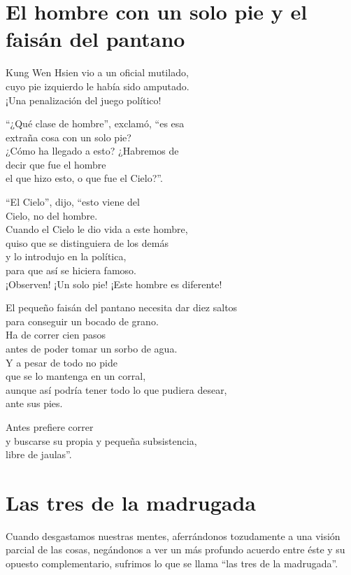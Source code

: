 \documentclass[hidelinks]{memoir}
\begin{document}
	\chapter*{El hombre con un solo pie y el faisán del pantano}
	
	Kung Wen Hsien vio a un oficial mutilado,\\
	cuyo pie izquierdo le había sido amputado.\\
	¡Una penalización del juego político!
	
	``¿Qué clase de hombre'', exclamó, ``es esa\\
	extraña cosa con un solo pie?\\
	¿Cómo ha llegado a esto? ¿Habremos de\\
	decir que fue el hombre\\
	el que hizo esto, o que fue el Cielo?''.
	
	``El Cielo'', dijo, ``esto viene del\\
	Cielo, no del hombre.\\
	Cuando el Cielo le dio vida a este hombre,\\
	quiso que se distinguiera de los demás\\
	y lo introdujo en la política,\\
	para que así se hiciera famoso.\\
	¡Observen! ¡Un solo pie! ¡Este hombre es diferente!
	
	El pequeño faisán del pantano necesita dar diez saltos\\
	para conseguir un bocado de grano.\\
	Ha de correr cien pasos\\
	antes de poder tomar un sorbo de agua.\\
	Y a pesar de todo no pide\\
	que se lo mantenga en un corral,\\
	aunque así podría tener todo lo que pudiera desear,\\
	ante sus pies.
	
	Antes prefiere correr\\
	y buscarse su propia y pequeña subsistencia,\\
	libre de jaulas''.
	
	\chapter*{Las tres de la madrugada}
	
	Cuando desgastamos nuestras mentes, aferrándonos tozudamente a una
	visión parcial de las cosas, negándonos a ver un más profundo acuerdo
	entre éste y su opuesto complementario, sufrimos lo que se llama ``las
	tres de la madrugada''.
	
\end{document}
